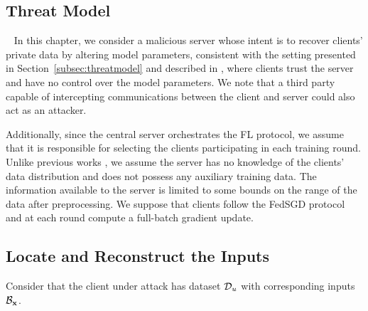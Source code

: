 \subsection{Threat Model}\
\label{sec:threat}
In this chapter, we consider a malicious server whose intent is to recover clients' private data by altering model parameters, consistent with the setting presented in Section~\ref{subsec:threatmodel} and described in \cite{wenFishingUserData2022a, boenischWhenCuriousAbandon2023, ZHANG2023119421}, where clients trust the server and have no control over the model parameters.
We note that a third party capable of intercepting communications between the client and server could also act as an attacker.

Additionally, since the central server orchestrates the FL protocol, we assume that it is responsible for selecting the clients participating in each training round. 
Unlike previous works \cite{fowlRobbingFedDirectly2021, wenFishingUserData2022a,boenischWhenCuriousAbandon2023,ZHANG2023119421,zhaoLOKILargescaleData2023a}, we assume the server has no knowledge of the clients' data distribution and does not possess any auxiliary training data. The information available to the server is limited to some bounds on the range of the data after preprocessing.
We suppose that clients follow the FedSGD protocol and at each round compute a full-batch gradient update. 
\subsection{Locate and Reconstruct the Inputs}\label{sec:loc_and_rec}
Consider that the client under attack has dataset $\mathcal{D}_u$ with corresponding inputs $\mathcal{B}_{{\mathbf{x}}}$.

